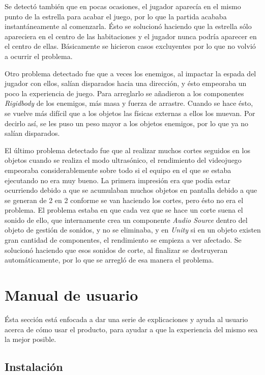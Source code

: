 Se detectó también que en pocas ocasiones, el jugador aparecía en el mismo punto de la estrella para acabar el juego, por lo que la partida acababa instantáneamente al comenzarla. Ésto se solucionó haciendo que la estrella sólo apareciera en el centro de las habitaciones y el jugador nunca podría aparecer en el centro de ellas. Básicamente se hicieron casos excluyentes por lo que no volvió a ocurrir el problema.

Otro problema detectado fue que a veces los enemigos, al impactar la espada del jugador con ellos, salían disparados hacia una dirección, y ésto empeoraba un poco la experiencia de juego. Para arreglarlo se añadieron a los componentes \textit{Rigidbody} de los enemigos, más masa y fuerza de arrastre. Cuando se hace ésto, se vuelve más difícil que a los objetos las físicas externas a ellos los muevan. Por decirlo así, se les puso un peso mayor a los objetos enemigos, por lo que ya no salían disparados.

El último problema detectado fue que al realizar muchos cortes seguidos en los objetos cuando se realiza el modo ultrasónico, el rendimiento del videojuego empeoraba considerablemente sobre todo si el equipo en el que se estaba ejecutando no era muy bueno. La primera impresión era que podía estar ocurriendo debido a que se acumulaban muchos objetos en pantalla debido a que se generan de 2 en 2 conforme se van haciendo los cortes, pero ésto no era el problema. El problema estaba en que cada vez que se hace un corte suena el sonido de ello, que internamente crea un componente \textit{Audio Source} dentro del objeto de gestión de sonidos, y no se eliminaba, y en \textit{Unity} si en un objeto existen gran cantidad de componentes, el rendimiento se empieza a ver afectado. Se solucionó haciendo que esos sonidos de corte, al finalizar se destruyeran automáticamente, por lo que se arregló de esa manera el problema.
\section{Manual de usuario}
\label{sec:manual}

Ésta sección está enfocada a dar una serie de explicaciones y ayuda al usuario acerca de cómo usar el producto, para ayudar a que la experiencia del mismo sea la mejor posible.

\subsection{Instalación}

